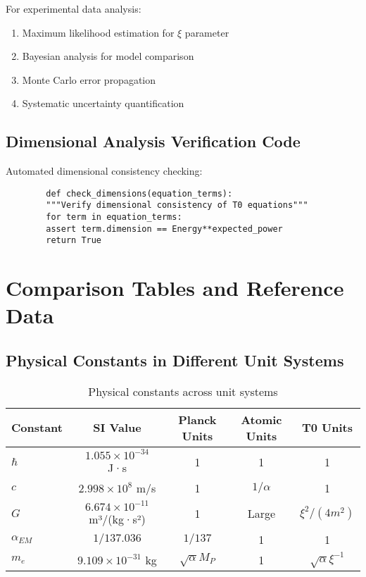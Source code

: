\documentclass[12pt,a4paper]{article}
\begin{document}
	For experimental data analysis:
	\begin{enumerate}
		\item Maximum likelihood estimation for $\xi$ parameter
		\item Bayesian analysis for model comparison
		\item Monte Carlo error propagation
		\item Systematic uncertainty quantification
	\end{enumerate}
	
	\subsection{Dimensional Analysis Verification Code}
	\label{app:dimensional_code}
	
	Automated dimensional consistency checking:
	\begin{verbatim}
		def check_dimensions(equation_terms):
		"""Verify dimensional consistency of T0 equations"""
		for term in equation_terms:
		assert term.dimension == Energy**expected_power
		return True
	\end{verbatim}
	
	\section{Comparison Tables and Reference Data}
	\label{app:comparison_tables}
	
	\subsection{Physical Constants in Different Unit Systems}
	\label{app:constants_table}
	
	\begin{table}[htbp]
		\centering
		\footnotesize
		\begin{tabular}{lcccc}
			\toprule
			\textbf{Constant} & \textbf{SI Value} & \textbf{Planck Units} & \textbf{Atomic Units} & \textbf{T0 Units} \\
			\midrule
			$\hbar$ & $1.055 \times 10^{-34}$ J·s & 1 & 1 & 1 \\
			$c$ & $2.998 \times 10^8$ m/s & 1 & $1/\alpha$ & 1 \\
			$G$ & $6.674 \times 10^{-11}$ m³/(kg·s²) & 1 & Large & $\xi^2/(4m^2)$ \\
			$\alpha_{EM}$ & $1/137.036$ & $1/137$ & 1 & 1 \\
			$m_e$ & $9.109 \times 10^{-31}$ kg & $\sqrt{\alpha} M_P$ & 1 & $\sqrt{\alpha} \xi^{-1}$ \\
			\bottomrule
		\end{tabular}
		\caption{Physical constants across unit systems}
		\label{tab:constants_comparison}
	\end{table}
	
\end{document}
